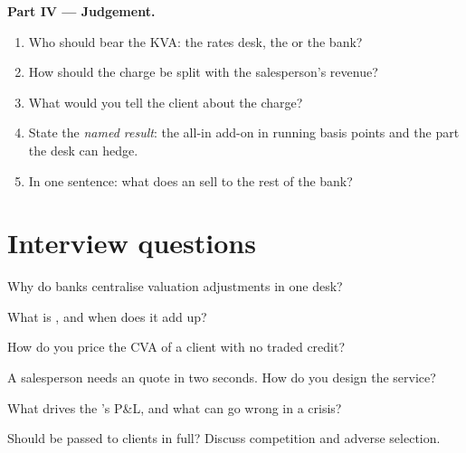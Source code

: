 \begin{problem}
\medskip\noindent\textbf{Part IV --- Judgement.}
\begin{enumerate}[resume]
\item Who should bear the KVA: the rates desk, the  or the bank?
\item How should the charge be split with the salesperson's revenue?
\item What would you tell the client about the charge?
\item State the \emph{named result}: the all-in add-on in running basis points and the part the
desk can hedge.
\item In one sentence: what does an  sell to the rest of the bank?
\end{enumerate}
\end{problem}

\section{Interview questions}

\begin{interviewq}\label{iq:rc:the-valuation-adjustment-desk:1}
Why do banks centralise valuation adjustments in one desk?
\end{interviewq}

\begin{interviewq}\label{iq:rc:the-valuation-adjustment-desk:2}
What is , and when does it add up?
\end{interviewq}

\begin{interviewq}\label{iq:rc:the-valuation-adjustment-desk:3}
How do you price the CVA of a client with no traded credit?
\end{interviewq}

\begin{interviewq}\label{iq:rc:the-valuation-adjustment-desk:4}
A salesperson needs an  quote in two seconds. How do you design the service?
\end{interviewq}

\begin{interviewq}\label{iq:rc:the-valuation-adjustment-desk:5}
What drives the 's P\&L, and what can go wrong in a crisis?
\end{interviewq}

\begin{interviewq}\label{iq:rc:the-valuation-adjustment-desk:6}
Should  be passed to clients in full? Discuss competition and adverse selection.
\end{interviewq}

